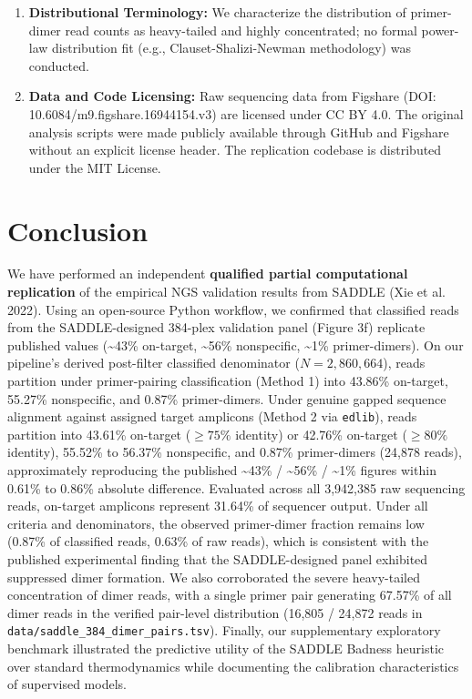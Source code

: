 \documentclass[
]{article}
\begin{document}
\begin{enumerate}
  software was withheld under patent protection and is not evaluated. In
  addition, the read classification is reimplemented in Python using
  cognate-anchored semi-global gapped alignment against target amplicons
  rather than Bowtie2 amplicon mapping in MATLAB.
\item
  \textbf{Distributional Terminology:} We characterize the distribution
  of primer-dimer read counts as heavy-tailed and highly concentrated;
  no formal power-law distribution fit (e.g., Clauset-Shalizi-Newman
  methodology) was conducted.
\item
  \textbf{Data and Code Licensing:} Raw sequencing data from Figshare
  (DOI: 10.6084/m9.figshare.16944154.v3) are licensed under CC BY 4.0.
  The original analysis scripts were made publicly available through
  GitHub and Figshare without an explicit license header. The
  replication codebase is distributed under the MIT License.
\end{enumerate}

\section{Conclusion}\label{conclusion}

We have performed an independent \textbf{qualified partial computational
replication} of the empirical NGS validation results from SADDLE (Xie et
al. 2022). Using an open-source Python workflow, we confirmed that
classified reads from the SADDLE-designed 384-plex validation panel
(Figure 3f) replicate published values (\textasciitilde43\% on-target,
\textasciitilde56\% nonspecific, \textasciitilde1\% primer-dimers). On
our pipeline's derived post-filter classified denominator
(\(N = 2,860,664\)), reads partition under primer-pairing classification
(Method 1) into 43.86\% on-target, 55.27\% nonspecific, and 0.87\%
primer-dimers. Under genuine gapped sequence alignment against assigned
target amplicons (Method 2 via \texttt{edlib}), reads partition into
43.61\% on-target (\(\ge 75\%\) identity) or 42.76\% on-target
(\(\ge 80\%\) identity), 55.52\% to 56.37\% nonspecific, and 0.87\%
primer-dimers (24,878 reads), approximately reproducing the published
\textasciitilde43\% / \textasciitilde56\% / \textasciitilde1\% figures
within 0.61\% to 0.86\% absolute difference. Evaluated across all
3,942,385 raw sequencing reads, on-target amplicons represent 31.64\% of
sequencer output. Under all criteria and denominators, the observed
primer-dimer fraction remains low (0.87\% of classified reads, 0.63\% of
raw reads), which is consistent with the published experimental finding
that the SADDLE-designed panel exhibited suppressed dimer formation. We
also corroborated the severe heavy-tailed concentration of dimer reads,
with a single primer pair generating 67.57\% of all dimer reads in the
verified pair-level distribution (16,805 / 24,872 reads in
\texttt{data/saddle\_384\_dimer\_pairs.tsv}). Finally, our supplementary
exploratory benchmark illustrated the predictive utility of the SADDLE
Badness heuristic over standard thermodynamics while documenting the
calibration characteristics of supervised models.
\end{document}
